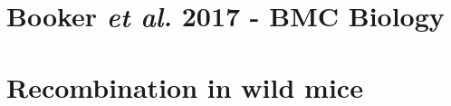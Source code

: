 \documentclass[openright,twoside,a4paper,english,11pt]{book}
\newcommand{\dir}{/Users/s0784966/Dropbox/Thesis}
\begin{document}
\frontmatter



	 
	
	
	\tableofcontents
	\listoffigures
	\listoftables
	\renewcommand{\contentsname}{Table of Contents}
	
\mainmatter
	
	\onehalfspacing

	

	
	
	
	
	

	\begin{appendices}
	  \chapter{Booker \emph{et al.} 2017 - BMC Biology}
%	  

	  \chapter{Recombination in wild mice}
		

	\end{appendices}
\end{document}
